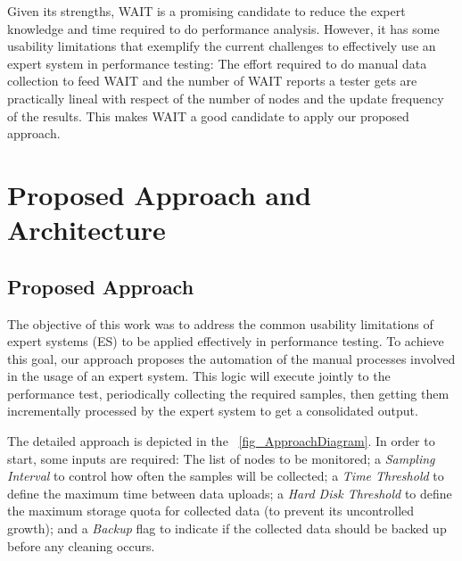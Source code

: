 \documentclass[runningheads,a4paper]{llncs}
\begin{document}
Given its strengths, WAIT is a promising candidate to reduce the expert
knowledge and time required to do performance analysis. However, it has
some usability limitations that exemplify the current challenges to effectively
use an expert system in performance testing: The effort required to
do manual data collection to feed WAIT and the number of WAIT reports a tester
gets are practically lineal with respect of the number of nodes and
the update frequency of the results. This makes WAIT a good candidate to apply
our proposed approach.

\vspace{-7pt}
\section{Proposed Approach and Architecture}
\label{ProposedApproach}
\vspace{-7pt}


\subsection{Proposed Approach}
\vspace{-7pt}
The objective of this work was to address the common usability limitations of
expert systems (ES) to be applied effectively in performance testing. To achieve
this goal, our approach proposes the automation of the manual processes involved
in the usage of an expert system. This logic will execute jointly to the
performance test, periodically collecting the required samples, then getting
them incrementally processed by the expert system to get a consolidated output.

The detailed approach is depicted in the \figurename
~\ref{fig_ApproachDiagram}. In order to start, some inputs are
required: The list of nodes to be monitored; a \emph{Sampling Interval} to
control how often the samples will be collected; a \emph{Time Threshold} to
define the maximum time between data uploads; a \emph{Hard Disk Threshold} to
define the maximum storage quota for collected data (to prevent its uncontrolled
growth); and a \emph{Backup} flag to indicate if the collected data should be
backed up before any cleaning occurs.
\end{document}
